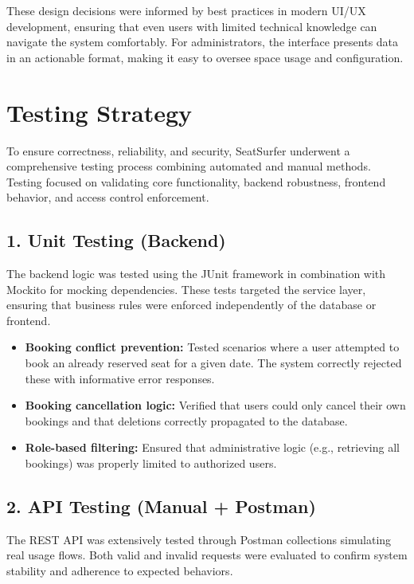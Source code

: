 \documentclass[12pt,a4paper]{report} %
\begin{document}
These design decisions were informed by best practices in modern UI/UX development, ensuring that even users with limited technical knowledge can navigate the system comfortably. For administrators, the interface presents data in an actionable format, making it easy to oversee space usage and configuration.

\section{Testing Strategy}

To ensure correctness, reliability, and security, SeatSurfer underwent a comprehensive testing process combining automated and manual methods. Testing focused on validating core functionality, backend robustness, frontend behavior, and access control enforcement.

\subsection*{1. Unit Testing (Backend)}

The backend logic was tested using the JUnit framework in combination with Mockito for mocking dependencies. These tests targeted the service layer, ensuring that business rules were enforced independently of the database or frontend.

\begin{itemize}
    \item \textbf{Booking conflict prevention:} Tested scenarios where a user attempted to book an already reserved seat for a given date. The system correctly rejected these with informative error responses.
    \item \textbf{Booking cancellation logic:} Verified that users could only cancel their own bookings and that deletions correctly propagated to the database.
    \item \textbf{Role-based filtering:} Ensured that administrative logic (e.g., retrieving all bookings) was properly limited to authorized users.
\end{itemize}

\subsection*{2. API Testing (Manual + Postman)}

The REST API was extensively tested through Postman collections simulating real usage flows. Both valid and invalid requests were evaluated to confirm system stability and adherence to expected behaviors.
\end{document}
